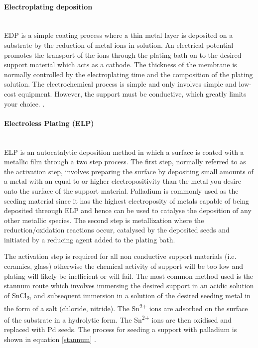 \paragraph*{Electroplating deposition}\\
EDP is a simple coating process where a thin metal layer is deposited on a substrate by the reduction of metal ions in solution. An electrical potential promotes the transport of the ions through the plating bath on to the desired support material which acts as a cathode. The thickness of the membrane is normally controlled by the electroplating time and the composition of the plating solution. The electrochemical process is simple and only involves simple and low-cost equipment. However, the support must be conductive, which greatly limits your choice. \cite{Yun2011a, NathanW.Ockwig2007a}.

\paragraph*{Electroless Plating (ELP)}\label{ELPREV}\\
ELP is an autocatalytic deposition method in which a surface is coated with a metallic film through a two step process. The first step, normally referred to as the activation step, involves preparing the surface by depositing small amounts of a metal with an equal to or higher electropositivity than the metal you desire onto the surface of the support material. Palladium is commonly used as the seeding material since it has the highest electroposity of metals capable of being deposited threough ELP and hence can be used to catalyse the deposition of any other metallic species. \cite{Exter2015}
The second step is metallization where the reduction/oxidation reactions occur, catalysed by the deposited seeds and initiated by a reducing agent added to the plating bath.

The activation step is required for all non conductive support materials (i.e. ceramics, glass) otherwise the chemical activity of support will be too low and plating will likely be inefficient or will fail. The most common method used is the stannum route which involves immersing the desired support in an acidic solution of SnCl\textsubscript{2}, and subsequent immersion in a solution of the desired seeding metal in the form of a salt (chloride, nitride). The Sn\textsuperscript{2+} ions are adsorbed on the surface of the substrate in a hydrolytic form. The Sn\textsuperscript{2+} ions are then oxidised and replaced with Pd seeds. \cite{Exter2015} The process for seeding a support with palladium is shown in equation \ref{stannum} \cite{Exter2015}.

